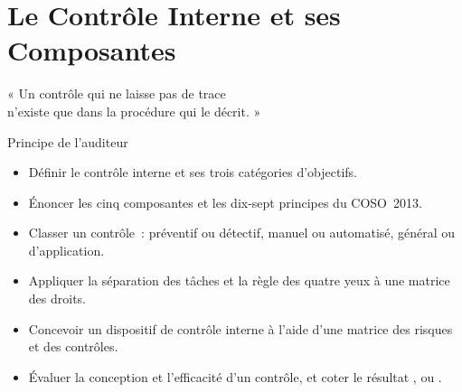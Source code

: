 
\chapter{Le Contrôle Interne et ses Composantes}
\label{chap:controle-interne}

\epigraph{%
    « Un contrôle qui ne laisse pas de trace\\
    n'existe que dans la procédure qui le décrit. »%
}{Principe de l'auditeur}


\begin{boxobjectifs}
\begin{itemize}
    \item Définir le contrôle interne et ses trois catégories d'objectifs.
    \item Énoncer les cinq composantes et les dix-sept principes du
          COSO~2013.
    \item Classer un contrôle~: préventif ou détectif, manuel ou automatisé,
          général ou d'application.
    \item Appliquer la séparation des tâches et la règle des quatre yeux à
          une matrice des droits.
    \item Concevoir un dispositif de contrôle interne à l'aide d'une matrice
          des risques et des contrôles.
    \item Évaluer la conception et l'efficacité d'un contrôle, et coter le
          résultat \OUI{}, \NON{} ou \NEK{}.
\end{itemize}
\end{boxobjectifs}

\bigskip

